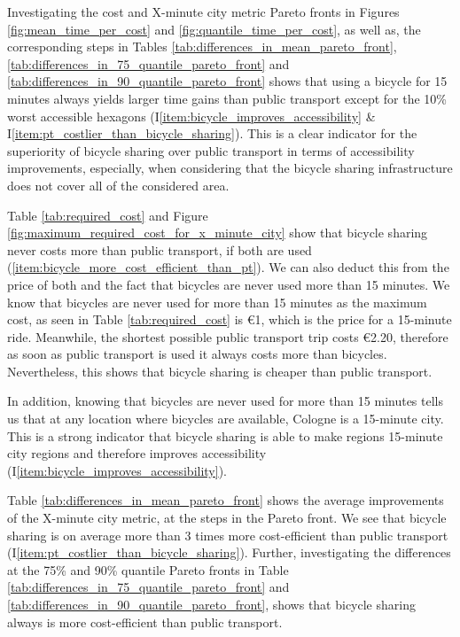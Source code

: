 Investigating the cost and X-minute city metric Pareto fronts in Figures \ref{fig:mean_time_per_cost} and \ref{fig:quantile_time_per_cost}, as well as, the corresponding steps in Tables \ref{tab:differences_in_mean_pareto_front}, \ref{tab:differences_in_75_quantile_pareto_front} and \ref{tab:differences_in_90_quantile_pareto_front} shows that using a bicycle for 15 minutes always yields larger time gains than public transport except for the 10\% worst accessible hexagons (I\ref{item:bicycle_improves_accessibility} \& I\ref{item:pt_costlier_than_bicycle_sharing}).
This is a clear indicator for the superiority of bicycle sharing over public transport in terms of accessibility improvements, especially, when considering that the bicycle sharing infrastructure does not cover all of the considered area.

Table \ref{tab:required_cost} and Figure \ref{fig:maximum_required_cost_for_x_minute_city} show that bicycle sharing never costs more than public transport, if both are used (\ref{item:bicycle_more_cost_efficient_than_pt}).
We can also deduct this from the price of both and the fact that bicycles are never used more than 15 minutes.
We know that bicycles are never used for more than 15 minutes as the maximum cost, as seen in Table \ref{tab:required_cost} is \euro{1}, which is the price for a 15-minute ride.
Meanwhile, the shortest possible public transport trip costs \euro{2.20}, therefore as soon as public transport is used it always costs more than bicycles.
Nevertheless, this shows that bicycle sharing is cheaper than public transport. 

In addition, knowing that bicycles are never used for more than 15 minutes tells us that at any location where bicycles are available, Cologne is a 15-minute city.
This is a strong indicator that bicycle sharing is able to make regions 15-minute city regions and therefore improves accessibility (I\ref{item:bicycle_improves_accessibility}).

Table \ref{tab:differences_in_mean_pareto_front} shows the average improvements of the X-minute city metric, at the steps in the Pareto front.
We see that bicycle sharing is on average more than 3 times more cost-efficient than public transport (I\ref{item:pt_costlier_than_bicycle_sharing}).
Further, investigating the differences at the 75\% and 90\% quantile Pareto fronts in Table \ref{tab:differences_in_75_quantile_pareto_front} and \ref{tab:differences_in_90_quantile_pareto_front}, shows that bicycle sharing always is more cost-efficient than public transport.

